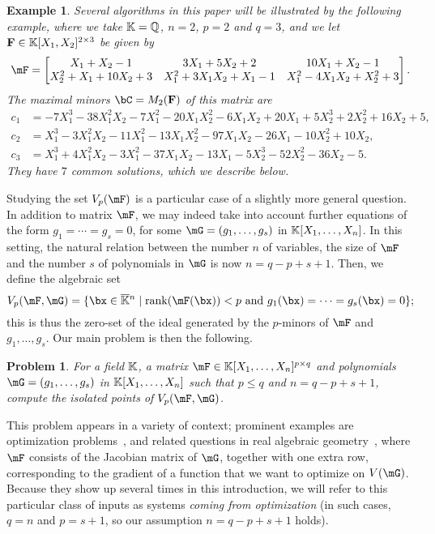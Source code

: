 \documentclass[12pt]{article}
\newtheorem{pbm}{Problem}
\newtheorem{example}[definition]{Example}
\begin{document}
\begin{example}\label{ex:1}
  Several algorithms in this paper will be illustrated by the following example,
  where we take $\mathbb{K}=\mathbb{Q}$, $n=2$, $p=2$ and $q=3$, and we let $\mathbf{F} \in \mathbb{K}[X_1,X_2]^{2 \times 3}$ 
  be given by 
  $$\mF=\begin{bmatrix}
  X_1+X_2-1 & 3X_1+5X_2+2  & 10X_1+X_2-1\\
  X_2^2+X_1+10X_2+3   & X_1^2+3X_1X_2+X_1-1  & X_1^2-4X_1X_2+X_2^2+3
  \end{bmatrix}.$$
  The maximal minors $\bC=M_2(\F)$ of this matrix are
  \begin{align*}
   c_1&= -7X_1^3 - 38X_1^2X_2 - 7X_1^2 - 20X_1X_2^2 - 6X_1X_2 + 20X_1 + 5X_2^3 +    2X_2^2 + 16X_2 + 5,\\
   c_2&=    X_1^3 - 3X_1^2X_2 - 11X_1^2 - 13X_1X_2^2 - 97X_1X_2 - 26X_1 - 10X_2^2 +    10X_2,\\
   c_3&=    X_1^3 + 4X_1^2X_2 - 3X_1^2 - 37X_1X_2 - 13X_1 - 5X_2^3 - 52X_2^2 - 36X_2 - 5.
  \end{align*}
  They have $7$ common solutions, which we describe below.
\end{example}



Studying the set $\VpF{p}{\mF}$ is a particular case of a slightly
more general question. In addition to matrix $\mF$, we may indeed take
into account further equations of the form $g_1 =\cdots=g_s=0$, for
some $\mG=(g_1,\dots,g_s)$ in $\mathbb{K}[X_1,\dots,X_n]$. In this setting, the
natural relation between the number $n$ of variables, the size of
$\mF$ and the number $s$ of polynomials in $\mG$ is now
$n=q-p+s+1$. Then, we define the algebraic set
$$\VpFG{p}{\mF}{\mG} = \{\bx \in \KKbar{}^n \mid
\mathrm{rank}(\mF({\bx})) < p \text{~and~} g_1(\bx)=\cdots=g_s(\bx)=0
\};$$ this is thus the zero-set of the ideal generated by the
$p$-minors of $\mF$ and $ g_1,\dots,g_s$. Our main problem is then the following.
\begin{pbm} \label{problem2} 
  For a field $\mathbb{K}$, a matrix $\mF \in \KK[X_1,\dots,X_n]^{p \times q}$ and
  polynomials $\mG=(g_1,\dots,g_s)$ in $\mathbb{K}[X_1,\dots,X_n]$ such that 
  $p \leq q$ and   $n = q-p+s+1$, compute the isolated points of $\VpFG{p}{\mF}{\mG}$.
\end{pbm}
This problem appears in a variety of context; prominent examples are
optimization problems~\cite{GSZ10,JP14,BGHS14,GS14,NDS06}, and related
questions in real algebraic
geometry~\cite{ARS,BaGiHeMb01,BaGiHePa05,BGHSS,BRSS,RealDecompICMS,CellDecompSurface,BertiniReal,RealNumerical,SaSc03,SaSc11,SaSc17},
where $\mF$ consists of the Jacobian matrix of $\mG$, together with
one extra row, corresponding to the gradient of a function that we
want to optimize on $V(\mG)$. Because they show up several times in
this introduction, we will refer to this particular class of inputs as
systems {\em coming from optimization} (in such cases, $q=n$ and $p=s+1$, 
so our assumption $n=q-p+s+1$ holds).
\end{document}
